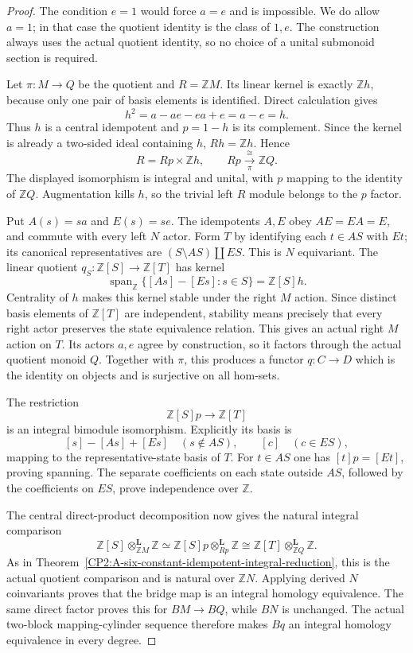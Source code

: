 \begin{proof}
The condition $e=1$ would force $a=e$ and is impossible.  We do
allow $a=1$; in that case the quotient identity is the class of
$1,e$.  The construction always uses the actual quotient identity,
so no choice of a unital submonoid section is required.

Let $\pi:M\to Q$ be the quotient and $R=\mathbb ZM$.
Its linear kernel is exactly $\mathbb Zh$, because only one pair
of basis elements is identified.  Direct calculation gives
\[
 h^2=a-ae-ea+e=a-e=h.
\]
Thus $h$ is a central idempotent and $p=1-h$ is its complement.
Since the kernel is already a two-sided ideal containing $h$,
$Rh=\mathbb Zh$.  Hence
\[
 R=Rp\times\mathbb Zh,
 \qquad Rp\xrightarrow[\pi]{\cong}\mathbb ZQ.
\]
The displayed isomorphism is integral and unital, with $p$ mapping
to the identity of $\mathbb ZQ$.  Augmentation kills $h$, so the
trivial left $R$ module belongs to the $p$ factor.

Put $A(s)=sa$ and $E(s)=se$.  The idempotents $A,E$ obey
$AE=EA=E$, and commute with every left $N$ actor.  Form $T$ by
identifying each $t\in AS$ with $Et$; its canonical representatives
are $(S\setminus AS)\amalg ES$.  This is $N$ equivariant.  The
linear quotient $q_S:\mathbb Z[S]\to\mathbb Z[T]$ has kernel
\[
 \operatorname{span}_{\mathbb Z}\{[As]-[Es]:s\in S\}
   =\mathbb Z[S]h.
\]
Centrality of $h$ makes this kernel stable under the right $M$
action.  Since distinct basis elements of $\mathbb Z[T]$ are
independent, stability means precisely that every right actor
preserves the state equivalence relation.  This gives an actual
right $M$ action on $T$.  Its actors $a,e$ agree by construction,
so it factors through the actual quotient monoid $Q$.  Together
with $\pi$, this produces a functor $q:C\to D$ which is the
identity on objects and is surjective on all hom-sets.

The restriction
\[
 \mathbb Z[S]p\longrightarrow\mathbb Z[T]
\]
is an integral bimodule isomorphism.  Explicitly its basis is
\[
 [s]-[As]+[Es]\quad(s\notin AS),\qquad [c]\quad(c\in ES),
\]
mapping to the representative-state basis of $T$.  For $t\in AS$
one has $[t]p=[Et]$, proving spanning.  The separate coefficients
on each state outside $AS$, followed by the coefficients on $ES$,
prove independence over $\mathbb Z$.

The central direct-product decomposition now gives the natural
integral comparison
\[
 \mathbb Z[S]\otimes_{\mathbb ZM}^{\mathbf L}\mathbb Z
 \simeq
 \mathbb Z[S]p\otimes_{Rp}^{\mathbf L}\mathbb Z
 \cong
 \mathbb Z[T]\otimes_{\mathbb ZQ}^{\mathbf L}\mathbb Z.
\]
As in Theorem~\ref{CP2:A-six-constant-idempotent-integral-reduction},
this is the actual quotient comparison and is natural over
$\mathbb ZN$.  Applying derived $N$ coinvariants proves that the
bridge map is an integral homology equivalence.  The same direct
factor proves this for $BM\to BQ$, while $BN$ is unchanged.
The actual two-block mapping-cylinder sequence therefore makes
$Bq$ an integral homology equivalence in every degree.


\end{proof}
